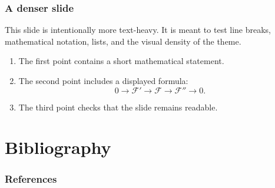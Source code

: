 \documentclass{beamer}
\begin{document}
\begin{frame}
    \frametitle{A denser slide}

    This slide is intentionally more text-heavy. It is meant to test line breaks,
    mathematical notation, lists, and the visual density of the theme.

    \begin{enumerate}
        \item The first point contains a short mathematical statement.
        \item The second point includes a displayed formula:
            \[
                0 \to \mathscr{F}' \to \mathscr{F} \to \mathscr{F}'' \to 0.
            \]
        \item The third point checks that the slide remains readable.
    \end{enumerate}
\end{frame}

\section{Bibliography}

\begin{frame}[allowframebreaks]
    \frametitle{References}
    \printbibliography
\end{frame}
\end{document}
